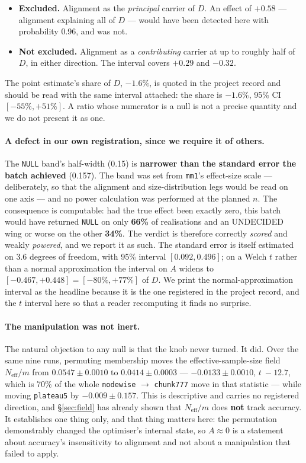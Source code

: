 \documentclass[10pt,letterpaper]{article}
\newcommand{\Dstat}{D}                         %
\newcommand{\Astat}{A}                         %
\newcommand{\plateau}{\texttt{plateau5}}
\newcommand{\arm}[1]{\texttt{#1}}
\begin{document}
\begin{itemize}
\item \textbf{Excluded.} Alignment as the \emph{principal} carrier of $\Dstat$. An effect of
  $+0.58$ --- alignment explaining all of $\Dstat$ --- would have been detected here with
  probability 0.96, and was not.
\item \textbf{Not excluded.} Alignment as a \emph{contributing} carrier at up to roughly half of
  $\Dstat$, in either direction. The interval covers $+0.29$ and $-0.32$.
\end{itemize}

The point estimate's share of $\Dstat$, $-1.6\%$, is quoted in the project record and should be
read with the same interval attached: the share is $\mathbf{-1.6\%}$, 95\% CI
$[-55\%, +51\%]$. A ratio whose numerator is a null is not a precise quantity and we do not
present it as one.

\paragraph{A defect in our own registration, since we require it of others.}
The \texttt{NULL} band's half-width (0.15) is \textbf{narrower than the standard error the batch
achieved} (0.157). The band was set from \arm{mm1}'s effect-size scale --- deliberately, so that
the alignment and size-distribution legs would be read on one axis --- and no power calculation
was performed at the planned $n$. The consequence is computable: had the true effect been
exactly zero, this batch would have returned \texttt{NULL} on only \textbf{66\%} of realisations
and an UNDECIDED wing or worse on the other \textbf{34\%}. The verdict is therefore correctly
\emph{scored} and weakly \emph{powered}, and we report it as such. The standard error is itself
estimated on 3.6 degrees of freedom, with 95\% interval $[0.092, 0.496]$; on a Welch $t$ rather
than a normal approximation the interval on $\Astat$ widens to
$[-0.467, +0.448] = [-80\%, +77\%]$ of $\Dstat$. We print the normal-approximation interval as
the headline because it is the one registered in the project record, and the $t$ interval here so
that a reader recomputing it finds no surprise.

\paragraph{The manipulation was not inert.}
The natural objection to any null is that the knob never turned. It did. Over the same nine runs,
permuting membership moves the effective-sample-size field $N_{\mathrm{eff}}/m$ from
$0.0547 \pm 0.0010$ to $0.0414 \pm 0.0003$ --- $\mathbf{-0.0133 \pm 0.0010}$, $t\ -12.7$, which
is 70\% of the whole \arm{nodewise} $\rightarrow$ \arm{chunk777} move in that statistic --- while
moving \plateau{} by $-0.009 \pm 0.157$. This is descriptive and carries no registered direction,
and \S\ref{sec:field} has already shown that $N_{\mathrm{eff}}/m$ does \textbf{not} track
accuracy. It establishes one thing only, and that thing matters here: the permutation demonstrably
changed the optimiser's internal state, so $\Astat \approx 0$ is a statement about accuracy's
insensitivity to alignment and not about a manipulation that failed to apply.
\end{document}

